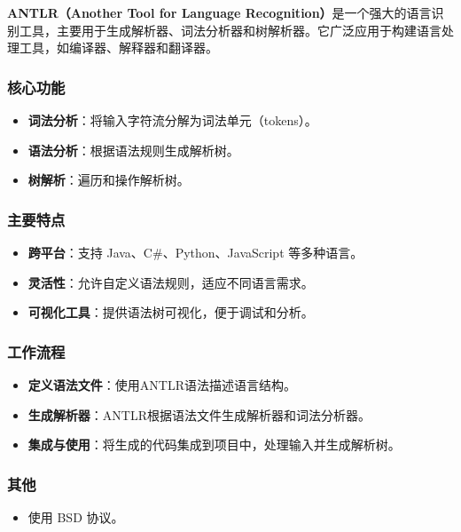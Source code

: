 
\textbf{ANTLR（Another Tool for Language Recognition）}是一个强大的语言识别工具，主要用于生成解析器、词法分析器和树解析器。它广泛应用于构建语言处理工具，如编译器、解释器和翻译器。

\subsubsection{核心功能}
\begin{itemize}
\item \textbf{\textbf{词法分析}}：将输入字符流分解为词法单元（tokens）。
\item \textbf{语法分析}：根据语法规则生成解析树。
\item \textbf{树解析}：遍历和操作解析树。
\end{itemize}

\subsubsection{主要特点}
\begin{itemize}
\item \textbf{\textbf{跨平台}}：支持 Java、C#、Python、JavaScript 等多种语言。
\item \textbf{灵活性}：允许自定义语法规则，适应不同语言需求。
\item \textbf{可视化工具}：提供语法树可视化，便于调试和分析。
\end{itemize}

\subsubsection{工作流程}
\begin{itemize}
\item \textbf{定义语法文件}：使用ANTLR语法描述语言结构。
\item \textbf{生成解析器}：ANTLR根据语法文件生成解析器和词法分析器。
\item \textbf{集成与使用}：将生成的代码集成到项目中，处理输入并生成解析树。
\end{itemize}

\subsubsection{其他}
\begin{itemize}
\item 使用 BSD 协议。
\end{itemize}
